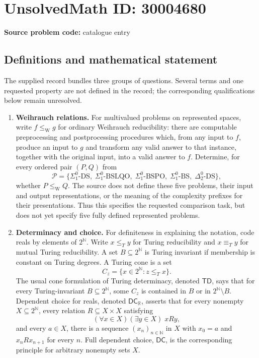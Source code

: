 \documentclass[11pt]{article}
\newcommand{\N}{\mathbb{N}}
\newcommand{\R}{\mathbb{R}}
\begin{document}
\section*{UnsolvedMath ID: 30004680}
\textbf{Source problem code:} catalogue entry
\subsection{Definitions and mathematical statement}
The supplied record bundles three groups of questions. Several terms and one requested property are not defined in the record; the corresponding qualifications below remain unresolved.

\begin{enumerate}
\item \textbf{Weihrauch relations.} For multivalued problems on represented spaces, write \(f\leq_{\mathrm W}g\) for ordinary Weihrauch reducibility: there are computable preprocessing and postprocessing procedures which, from any input to \(f\), produce an input to \(g\) and transform any valid answer to that instance, together with the original input, into a valid answer to \(f\). Determine, for every ordered pair \((P,Q)\) from
\[
\mathcal P=\bigl\{
\Sigma^0_1\text{-DS},\;
\Sigma^0_1\text{-BSLQO},\;
\Sigma^0_1\text{-BSPO},\;
\Sigma^0_1\text{-BS},\;
\Delta^0_2\text{-DS}
\bigr\},
\]
whether \(P\leq_{\mathrm W}Q\). The source does not define these five problems, their input and output representations, or the meaning of the complexity prefixes for their presentations. Thus this specifies the requested comparison task, but does not yet specify five fully defined represented problems.

\item \textbf{Determinacy and choice.} For definiteness in explaining the notation, code reals by elements of \(2^{\N}\). Write \(x\leq_T y\) for Turing reducibility and \(x\equiv_T y\) for mutual Turing reducibility. A set \(B\subseteq2^{\N}\) is Turing invariant if membership is constant on Turing degrees. A Turing cone is a set
\[
C_z=\{x\in2^{\N}:z\leq_T x\}.
\]
The usual cone formulation of Turing determinacy, denoted \(\mathsf{TD}\), says that for every Turing-invariant \(B\subseteq2^{\N}\), some \(C_z\) is contained in \(B\) or in \(2^{\N}\setminus B\). Dependent choice for reals, denoted \(\mathsf{DC}_{\R}\), asserts that for every nonempty \(X\subseteq2^{\N}\), every relation \(R\subseteq X\times X\) satisfying
\[
(\forall x\in X)(\exists y\in X)\;xRy,
\]
and every \(a\in X\), there is a sequence \((x_n)_{n\in\N}\) in \(X\) with \(x_0=a\) and \(x_nRx_{n+1}\) for every \(n\). Full dependent choice, \(\mathsf{DC}\), is the corresponding principle for arbitrary nonempty sets \(X\).


\end{enumerate}
\end{document}
